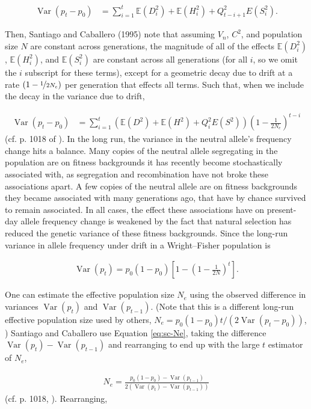 \documentclass[11pt]{article}
\newcommand{\E}{\mathbb{E}}
\DeclareMathOperator{\var}{Var}
\begin{document}
\begin{align}
    \var(p_t - p_0) &= \sum_{i=1}^t \E(D_i^2) + \E(H_i^2) + Q_{t-i+1}^2 E(S_i^2).
\end{align}

Then, Santiago and Caballero (1995) note that assuming $V_n$, $C^2$, and
population size $N$ are constant across generations, the magnitude of all of
the effects $\E(D_i^2)$, $\E(H_i^2)$, and $\E(S_i^2)$ are constant across all
generations (for all $i$, so we omit the $i$ subscript for these terms), except
for a geometric decay due to drift at a rate $(1-\nicefrac{1}{2N_e})$ per
generation that effects all terms. Such that, when we include the decay in the
variance due to drift,

\begin{align}
  \var(p_t - p_0) &= \sum_{i=1}^t \left(\E(D^2) + \E(H^2) + Q_{i}^2 E(S^2) \right) \left( 1 - \frac{1}{2N_e} \right)^{t-i}
  \label{eq:var-sc}
\end{align}
%
(cf. p. 1018 of \cite{Santiago1995-hx}). In the long run, the variance in the
neutral allele's frequency change hits a balance. Many copies of the neutral
allele segregating in the population are on fitness backgrounds it has recently
become stochastically associated with, as segregation and recombination have
not broke these associations apart. A few copies of the neutral allele are on
fitness backgrounds they became associated with many generations ago, that have
by chance survived to remain associated. In all cases, the effect these
associations have on present-day allele frequency change is weakened by the
fact that natural selection has reduced the genetic variance of these fitness
backgrounds. Since the long-run variance in allele frequency under drift in a
Wright--Fisher population is

\begin{align}
  \var(p_t) = p_0(1-p_0) \left[1 - \left(1 - \frac{1}{2N}\right)^t \right].
  \label{eq:sc-Ne}
\end{align}

One can estimate the effective population size $N_e$ using the observed
difference in variances $\var(p_t)$ and $\var(p_{t-1})$. (Note that this is
a different long-run effective population size used by others, $N_e =
p_0(1-p_0) t / (2\var(p_t - p_0))$, \cite{Crow1970-wm}) Santiago and
Caballero use Equation \eqref{eq:sc-Ne}, taking the difference $\var(p_t) -
\var(p_{t-1})$ and rearranging to end up with the large $t$ estimator of $N_e$, 

\begin{align}
  N_e = \frac{p_0(1-p_0) - \var(p_{t-1})}{2(\var(p_t) - \var(p_{t-1}))}
\end{align}
%
(cf. p. 1018, \cite{Santiago1995-hx}). Rearranging,
\end{document}
